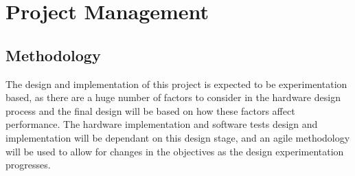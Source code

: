 \chapter{Project Management}
\label{ch:project_management}

\section{Methodology}
The design and implementation of this project is expected to be experimentation based, as there are a huge number of factors to consider in the hardware design process and the final design will be based on how these factors affect performance. The hardware implementation and software tests design and implementation will be dependant on this design stage, and an agile methodology will be used to allow for changes in the objectives as the design experimentation progresses.